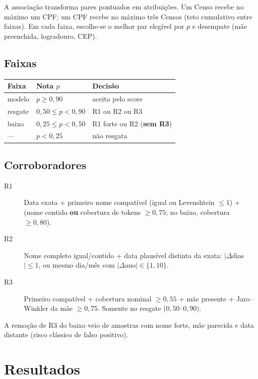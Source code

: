 \documentclass[11pt,a4paper]{article}
\begin{document}
A associação transforma pares pontuados em atribuições. Um Censo recebe no
máximo um CPF; um CPF recebe no máximo três Censos (teto cumulativo entre
faixas). Em cada faixa, escolhe-se o melhor par elegível por $p$ e desempate
(mãe preenchida, logradouro, CEP).

\subsection{Faixas}

\begin{center}
\begin{tabular}{@{}llp{7.2cm}@{}}
\toprule
Faixa & Nota $p$ & Decisão \\
\midrule
modelo & $p \ge 0{,}90$ & aceita pelo score \\
resgate & $0{,}50 \le p < 0{,}90$ & R1 ou R2 ou R3 \\
baixo & $0{,}25 \le p < 0{,}50$ & R1 forte ou R2 (\textbf{sem R3}) \\
--- & $p < 0{,}25$ & não resgata \\
\bottomrule
\end{tabular}
\end{center}

\subsection{Corroboradores}

\begin{description}
  \item[R1]
    Data exata + primeiro nome compatível (igual ou Levenshtein $\le 1$) +
    (nome contido \textbf{ou} cobertura de tokens $\ge 0{,}75$; no baixo,
    cobertura $\ge 0{,}80$).
  \item[R2]
    Nome completo igual/contido + data plausível distinta da exata:
    $|\Delta$dias$| \le 1$, ou mesmo dia/mês com $|\Delta$ano$| \in \{1,10\}$.
  \item[R3]
    Primeiro compatível + cobertura nominal $\ge 0{,}55$ + mãe presente +
    Jaro--Winkler da mãe $\ge 0{,}75$. Somente no resgate
    ($0{,}50$--$0{,}90$).
\end{description}

A remoção de R3 do baixo veio de amostras com nome forte, mãe parecida e data
distante (risco clássico de falso positivo).

\section{Resultados}
\end{document}
